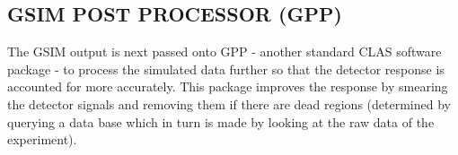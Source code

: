 

\subsection{GSIM POST PROCESSOR (GPP)} 
 \label{gpp}
The GSIM output is next passed onto GPP - another standard %
CLAS software package - to process the simulated data further so that the detector response is accounted for more accurately. This package improves the response by smearing the detector signals and removing them if there are dead regions (determined by querying %
a data base which in turn is made by looking at the raw data of the experiment).


%









